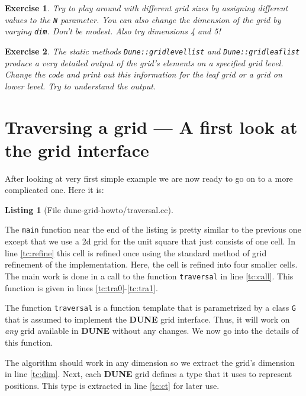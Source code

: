 \documentclass[11pt,a4paper,headinclude,footinclude,DIV16,normalheadings]{scrreprt}
\newcommand{\Dune}{{\sf\bfseries DUNE}\xspace}
\newtheorem{exc}{Exercise}[chapter]
\newtheorem{lst}{Listing}
\begin{document}
\begin{exc} Try to play around with different grid sizes by assigning
  different values to the \lstinline!N! parameter. You can also change
  the dimension of the grid by varying \lstinline!dim!. Don't be
  modest. Also try dimensions 4 and 5!
\end{exc}

\begin{exc} 
  The static methods \lstinline!Dune::gridlevellist! and
  \lstinline!Dune::gridleaflist! produce a very detailed output of the grid's
  elements on a specified grid level. Change the code and print out this
  information for the leaf grid or a grid on lower level. Try to understand the
  output. 
\end{exc}

\section{Traversing a grid --- A first look at the grid interface}

After looking at very first simple example we are now ready to go on
to a more complicated one. Here it is:

\begin{lst}[File dune-grid-howto/traversal.cc] \mbox{}
\nopagebreak

\end{lst}

The \lstinline!main! function near the end of the listing is pretty
similar to the previous one except that we use a 2d grid for the unit
square that just consists of one cell. In line \ref{tc:refine} this
cell is refined once using the standard method of grid refinement of
the implementation. Here, the cell is refined into four smaller cells.
The main work is done in a call to the function \lstinline!traversal!
in line \ref{tc:call}.  This function is given in lines
\ref{tc:tra0}-\ref{tc:tra1}.

The function \lstinline!traversal! is a function template that is
parametrized by a class \lstinline!G! that is assumed to implement
the \Dune{} grid interface.  Thus, it will work on \textit{any} grid
available in \Dune{} without any changes. We now go into the details
of this function.

The algorithm should work in any dimension so we extract the grid's
dimension in line \ref{tc:dim}. Next, each \Dune{} grid defines a type
that it uses to represent positions. This type is extracted in line
\ref{tc:ct} for later use.
\end{document}
